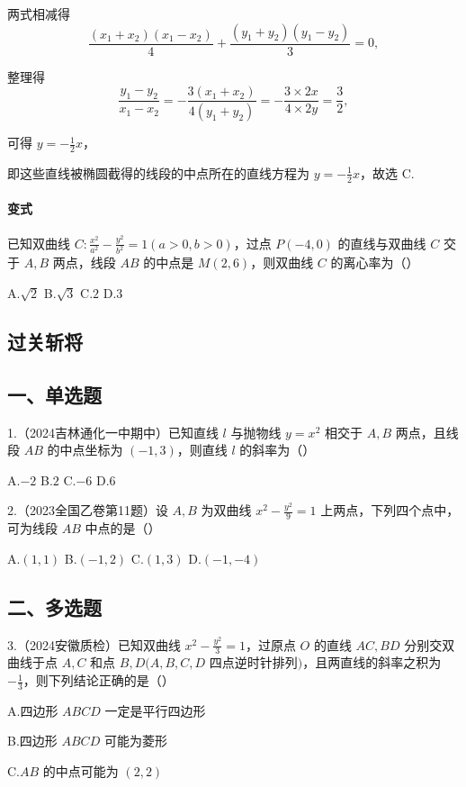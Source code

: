 \documentclass[UTF8,a4paper,11pt]{ctexart}
\begin{document}
两式相减得
\[
\frac{(x_1+x_2)(x_1-x_2)}{4}+\frac{(y_1+y_2)(y_1-y_2)}{3}=0,
\]

整理得
\[
\frac{y_1-y_2}{x_1-x_2}=-\frac{3(x_1+x_2)}{4(y_1+y_2)}=-\frac{3\times 2x}{4\times 2y}=\frac{3}{2},
\]

可得 $y=-\frac{1}{2}x$，

即这些直线被椭圆截得的线段的中点所在的直线方程为 $y=-\frac{1}{2}x$，故选 C.

\paragraph{变式} 已知双曲线 $C:\frac{x^2}{a^2}-\frac{y^2}{b^2}=1(a>0,b>0)$，过点 $P(-4,0)$ 的直线与双曲线 $C$ 交于 $A,B$ 两点，线段 $AB$ 的中点是 $M(2,6)$，则双曲线 $C$ 的离心率为\hfill（\qquad）

A.$\sqrt{2}$ \qquad B.$\sqrt{3}$ \qquad C.$2$ \qquad D.$3$

\subsection{过关斩将}

\subsection*{一、单选题}

1.（2024吉林通化一中期中）已知直线 $l$ 与抛物线 $y=x^2$ 相交于 $A,B$ 两点，且线段 $AB$ 的中点坐标为 $(-1,3)$，则直线 $l$ 的斜率为\hfill（\qquad）

A.$-2$ \qquad B.$2$ \qquad C.$-6$ \qquad D.$6$

2.（2023全国乙卷第11题）设 $A,B$ 为双曲线 $x^2-\frac{y^2}{9}=1$ 上两点，下列四个点中，可为线段 $AB$ 中点的是\hfill（\qquad）

A.$(1,1)$ \qquad B.$(-1,2)$ \qquad C.$(1,3)$ \qquad D.$(-1,-4)$

\subsection*{二、多选题}

3.（2024安徽质检）已知双曲线 $x^2-\frac{y^2}{3}=1$，过原点 $O$ 的直线 $AC,BD$ 分别交双曲线于点 $A,C$ 和点 $B,D(A,B,C,D$ 四点逆时针排列$)$，且两直线的斜率之积为 $-\frac{1}{3}$，则下列结论正确的是\hfill（\qquad）

A.四边形 $ABCD$ 一定是平行四边形

B.四边形 $ABCD$ 可能为菱形

C.$AB$ 的中点可能为 $(2,2)$
\end{document}
